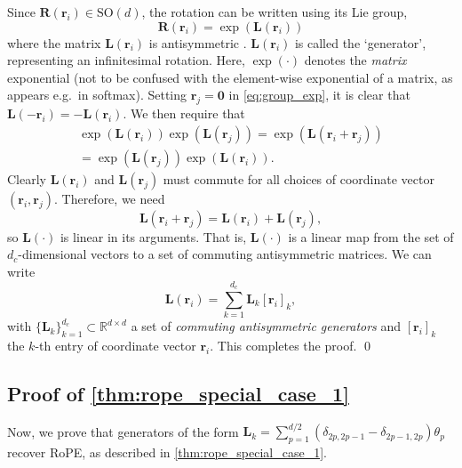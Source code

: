 Since $\mathbf{R}(\boldsymbol{r}_i) \in \textrm{SO}(d)$, the rotation can be written using its Lie group, 
\begin{equation}
    \mathbf{R}(\boldsymbol{r}_i) = \exp( \mathbf{L}(\boldsymbol{r}_i))
\end{equation}
where the matrix $\mathbf{L}(\boldsymbol{r}_i)$ is antisymmetric \citep{hall2013lie}. 
$\mathbf{L}(\boldsymbol{r}_i)$ is called the `generator', representing an infinitesimal rotation.
Here, $\exp(\cdot)$ denotes the \emph{matrix} exponential (not to be confused with the element-wise exponential of a matrix, as appears e.g.~in softmax).
Setting $\boldsymbol{r}_j=\boldsymbol{0}$ in \cref{eq:group_exp}, it is clear that $\mathbf{L}(-\boldsymbol{r}_i) = - \mathbf{L}(\boldsymbol{r}_i)$.
We then require that
\begin{equation}
\begin{multlined}
    \exp(\mathbf{L}(\boldsymbol{r}_i)) \exp(\mathbf{L}(\boldsymbol{r}_j)) = \exp(\mathbf{L}(\boldsymbol{r}_i + \boldsymbol{r}_j)) 
    \\ = \exp(\mathbf{L}(\boldsymbol{r}_j)) \exp(\mathbf{L}(\boldsymbol{r}_i)). 
\end{multlined}
\end{equation}
Clearly $\mathbf{L}(\boldsymbol{r}_i)$ and $\mathbf{L}(\boldsymbol{r}_j)$ must commute for all choices of coordinate vector $(\boldsymbol{r}_i, \boldsymbol{r}_j)$. 
Therefore, we need
\begin{equation}
    \mathbf{L}(\boldsymbol{r}_i + \boldsymbol{r}_j) = \mathbf{L}(\boldsymbol{r}_i) + \mathbf{L}(\boldsymbol{r}_j),
\end{equation}
so $\mathbf{L}(\cdot)$ is linear in its arguments.
That is, $ \mathbf{L}(\cdot)$ is a linear map from the set of $d_c$-dimensional vectors to a set of commuting antisymmetric matrices.
We can write
\begin{equation}
    \mathbf{L}(\boldsymbol{r}_i) = \sum_{k=1}^{d_c} \mathbf{L}_k [\boldsymbol{r}_i]_k,
\end{equation}
with $\{\mathbf{L}_k\}_{k=1}^{d_c} \subset \mathbb{R}^{d \times d}$ a set of \emph{commuting antisymmetric generators} and $[\boldsymbol{r}_i]_k$ the $k$-th entry of coordinate vector $\boldsymbol{r}_i$.
This completes the proof. \qed

\subsection{Proof of \cref{thm:rope_special_case_1}}
Now, we prove that generators of the form 
$\mathbf{L}_k =  \sum_{p=1}^{d/2} (\delta_{2p,2p-1} - \delta_{2p-1,2p}) \theta_p$ recover RoPE, as described in \cref{thm:rope_special_case_1}.

